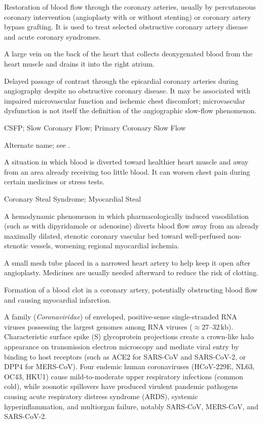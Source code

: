  Restoration of blood flow through the coronary arteries, usually by percutaneous coronary intervention (angioplasty with or without stenting) or coronary artery bypass grafting. It is used to treat selected obstructive coronary artery disease and acute coronary syndromes.

 A large vein on the back of the heart that collects deoxygenated blood from the heart
muscle and drains it into the right atrium.

 Delayed passage of contrast through
the epicardial coronary arteries during angiography despite no obstructive
coronary disease. It may be associated with impaired microvascular function
and ischemic chest discomfort; microvascular dysfunction is not itself the
definition of the angiographic slow-flow phenomenon.

\synonyms
CSFP; Slow Coronary Flow; Primary Coronary Slow Flow

 Alternate name; see .

 A situation in which blood is diverted toward healthier heart muscle and away from an area already receiving too little blood. It can worsen chest pain during certain medicines or stress tests.

\synonyms
Coronary Steal Syndrome; Myocardial Steal

 A hemodynamic phenomenon in which pharmacologically induced vasodilation (such as with dipyridamole or adenosine) diverts blood flow away from an already maximally dilated, stenotic coronary vascular bed toward well-perfused non-stenotic vessels, worsening regional myocardial ischemia.

 A small mesh tube placed in a narrowed heart artery to help keep it open after angioplasty. Medicines are usually needed afterward to reduce the risk of clotting.

 Formation of a blood clot in a coronary artery, potentially obstructing blood flow and causing
myocardial infarction.

 A family (\textit{Coronaviridae}) of enveloped, positive-sense single-stranded RNA viruses possessing the largest genomes among RNA viruses ($\approx 27\text{--}32\,\text{kb}$). Characteristic surface spike (S) glycoprotein projections create a crown-like halo appearance on transmission electron microscopy and mediate viral entry by binding to host receptors (such as ACE2 for SARS-CoV and SARS-CoV-2, or DPP4 for MERS-CoV). Four endemic human coronaviruses (HCoV-229E, NL63, OC43, HKU1) cause mild-to-moderate upper respiratory infections (common cold), while zoonotic spillovers have produced virulent pandemic pathogens causing acute respiratory distress syndrome (ARDS), systemic hyperinflammation, and multiorgan failure, notably SARS-CoV, MERS-CoV, and SARS-CoV-2.

